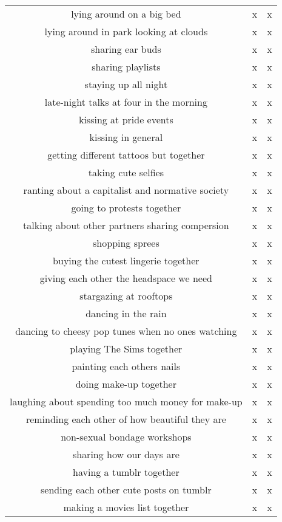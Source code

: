 \documentclass[a4paper]{article}
\begin{document}
\begin{table}[htb]
\begin{adjustbox}{width=1\textwidth}
\begin{tabular}{@{}ccc@{}}
        lying around on a big bed &  x &  x \\
        lying around in park looking at clouds &  x &  x \\
        sharing ear buds &  x &  x \\
        sharing playlists &  x &  x \\
        staying up all night &  x &  x \\
        late-night talks at four in the morning &  x &  x \\
        kissing at pride events &  x &  x \\
        kissing in general &  x &  x \\
        getting different tattoos but together &  x &  x \\
        taking cute selfies &  x &  x \\
        ranting about a capitalist and normative society &  x &  x \\
        going to protests together &  x &  x \\
        talking about other partners sharing compersion &  x &  x \\
        shopping sprees &  x &  x \\
        buying the cutest lingerie together &  x &  x \\
        giving each other the headspace we need &  x &  x \\
        stargazing at rooftops &  x &  x \\
        dancing in the rain &  x &  x \\
        dancing to cheesy pop tunes when no ones watching &  x &  x \\
        playing The Sims together &  x &  x \\
        painting each others nails &  x &  x \\
        doing make-up together &  x &  x \\
        laughing about spending too much money for make-up &  x &  x \\
        reminding each other of how beautiful they are &  x &  x \\
        non-sexual bondage workshops &  x &  x \\
        sharing how our days are &  x &  x \\
        having a tumblr together &  x &  x \\
        sending each other cute posts on tumblr &  x &  x \\
        making a movies list together &  x &  x \\

\end{tabular}
\end{adjustbox}
\end{table}
\end{document}
